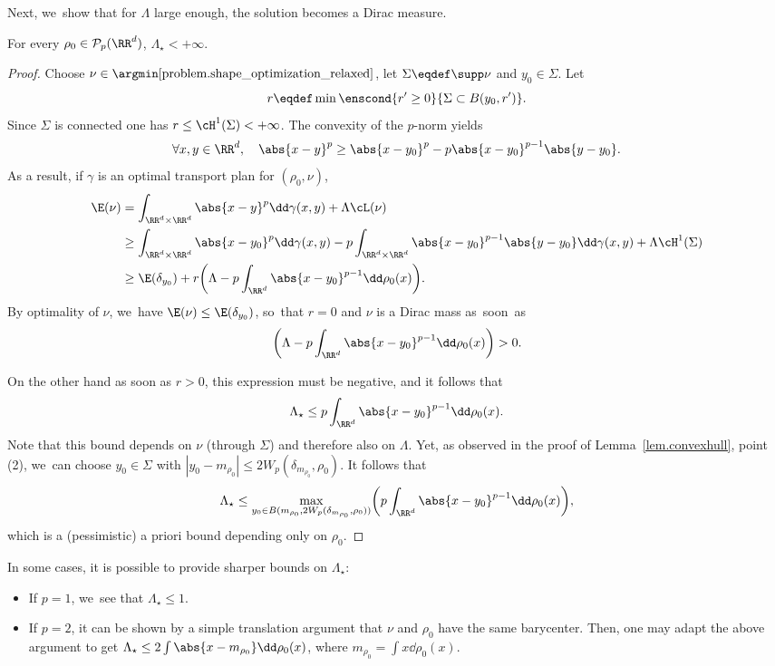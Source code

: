 Next, we~show that for $\Lambda$ large enough, the solution becomes a Dirac measure.

\begin{proposition}\label{proposition.critical_lambda_upper_bound}
For every $\rho_0 \in \mathcal{P}_p(\RR^d)$, $\Lambda_\star<+\infty$.
\end{proposition}

\begin{proof}
Choose $\nu \in \argmin \eqref{problem.shape_optimization_relaxed}$, let $\Sigma\eqdef \supp \nu$ and $y_0\in\Sigma$.
Let
\[
r\eqdef \min\enscond{r'\geq 0}{\Sigma \subset B(y_0,r')}.
\]
Since
$\Sigma$ is connected one has $r\leq \cH^1(\Sigma)<+\infty$.
The convexity of the $p$-norm yields
\begin{equation*}
\forall x,y \in \RR^d, \quad \abs{x-y}^p \geq \abs{x-y_0}^p -p\abs{x-y_0}^{p-1}\abs{y-y_0}.
\end{equation*}
As a result, if $\gamma$ is an optimal transport plan for $(\rho_0,\nu)$,
\begin{align*}
\E(\nu)&= \int_{\RR^d\times \RR^d}\abs{x-y}^p\dd \gamma(x,y)+\Lambda \cL(\nu)\\
&\geq \int_{\RR^d\times \RR^d}\abs{x-y_0}^p\dd \gamma(x,y) - p\int_{\RR^d\times \RR^d}\abs{x-y_0}^{p-1}\abs{y-y_0}\dd \gamma(x,y)+\Lambda \cH^1(\Sigma)\\
&\geq \E(\delta_{y_0})+ r \biggl(\Lambda - p\int_{\RR^d}\abs{x-y_0}^{p-1}\dd \rho_0(x) \biggr).
\end{align*}
By optimality of $\nu$, we~have $\E(\nu)\leq\E(\delta_{y_0})$, so~that $r=0$ and $\nu$ is a Dirac mass as~soon~as
\[
\left(\Lambda - p\int_{\RR^d}\abs{x-y_0}^{p-1}\dd \rho_0(x)\right)>0.
\]

On the other hand as soon as $r>0$, this expression
must be negative, and it follows that
\[
\Lambda_\star \le p\int_{\RR^d}\abs{x-y_0}^{p-1}\dd \rho_0(x).
\]
Note that this bound depends on $\nu$ (through $\Sigma$) and
therefore also on $\Lambda$.
Yet, as observed in the proof of
Lemma~\ref{lem.convexhull}, point (2), we~can choose $y_0\in\Sigma$
with $|y_0-m_{\rho_0}|\le 2W_p(\delta_{m_{\rho_0}},\rho_0)$. It follows that
\[
\Lambda_\star \le \max_{y_0
\in B(m_{\rho_0},2W_p(\delta_{m_{\rho_0}},\rho_0))}
\biggl(p\int_{\RR^d}\abs{x-y_0}^{p-1}\dd \rho_0(x) \biggr),
\]
which is a (pessimistic) a priori bound depending only on $\rho_0$.
\end{proof}

\begin{remark}
In some cases, it is possible to provide sharper bounds on $\Lambda_\star$:
\begin{itemize}
\item If $p=1$, we~see that $\Lambda_\star\leq 1$.
\item If $p=2$, it can be shown by a simple translation argument that $\nu$ and $\rho_0$ have the same barycenter. Then, one may adapt the above argument to get $\Lambda_\star \leq 2\int\abs{x-m_{\rho_0}}\dd \rho_0(x)$, where $m_{\rho_0}=\int x\dd \rho_0(x)$.
\end{itemize}
\end{remark}


